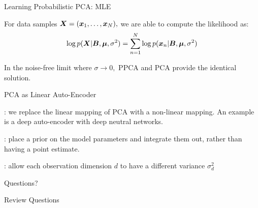 \documentclass[handout,fleqn,aspectratio=169]{beamer}
\begin{document}
\begin{frame}{Learning Probabilistic PCA: MLE}

\plitemsep 0.07in

\bci 
\item For data samples $\bm{X} = (\bm{x}_1, \ldots, \bm{x}_N),$ we are able to compute the likelihood as: 
$$
\log p(\bm{X} | \bm{B}, \bm{\mu}, \sigma^2 ) = \sum_{n=1}^N \log p(\bm{x}_n | \bm{B}, \bm{\mu}, \sigma^2)
$$

\item In the noise-free limit where $\sigma \rightarrow 0,$ PPCA and PCA provide the identical solution.
\eci
\end{frame}

\begin{frame}{PCA as Linear Auto-Encoder}


\vspace{-0.7cm}
\plitemsep 0.07in
\bci 
\item {}: we replace the linear mapping of PCA with a non-linear mapping. An example is a deep auto-encoder with deep neutral networks.
\item {}: place a prior on the model parameters and integrate them out, rather than having a point estimate.
\item {}: allow each observation dimension $d$ to have a different variance $\sigma_d^2$
\eci
\end{frame}


\begin{frame}{}
\vspace{2cm}
\LARGE Questions?


\end{frame}

\begin{frame}{Review Questions}
\bce[1)]
\item 

\ece
\end{frame}
\end{document}
